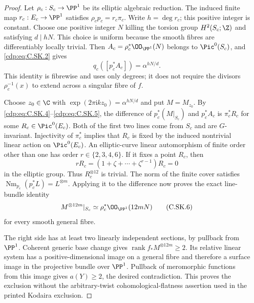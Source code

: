 \begin{proof}
Let $\rho_c:S_c\to\PP^1$ be its elliptic algebraic
reduction. The induced finite map $r_c:E_c\to\PP^1$
satisfies $\rho_c p_c=r_c\pi_c$. Write $h=\deg r_c$;
this positive integer is constant. Choose one positive
integer $N$ killing the torsion group $H^2(S_c;\Z)$
and satisfying $d\mid hN$. This choice is uniform
because the smooth fibres are differentiably locally
trivial. Then
$A_c=\rho_c^*\OO_{\PP^1}(N)$ belongs to $\Pic^0(S_c)$,
and \eqref{cdp:eq:C.SK.2} gives
\[
 q_c([p_c^*A_c])=\alpha^{hN/d}.
\tag{C.SK.5}\label{cdp:eq:C.SK.5}
\]
This identity is fibrewise and uses only degrees; it
does not require the divisors $\rho_c^{-1}(x)$ to
extend across a singular fibre of $f$.

Choose $z_0\in\C$ with
$\exp(2\pi\mathrm i k z_0)=\alpha^{hN/d}$ and put
$M=M_{z_0}$. By \eqref{cdp:eq:C.SK.4}--\eqref{cdp:eq:C.SK.5}, the difference of
$p_c^*(M|_{S_c})$ and $p_c^*A_c$ is
$\pi_c^*R_c$ for some $R_c\in\Pic^0(E_c)$.
Both of the first two lines come from $S_c$ and are
$G$-invariant. Injectivity of $\pi_c^*$ implies that
$R_c$ is fixed by the induced nontrivial linear action
on $\Pic^0(E_c)$. An elliptic-curve linear automorphism
of finite order other than one has order
$r\in\{2,3,4,6\}$. If it fixes a point $R_c$, then
\[
 rR_c=(1+\zeta+\cdots+\zeta^{r-1})R_c=0
\]
in the elliptic group. Thus $R_c^{\otimes12}$ is
trivial. The norm of the finite cover satisfies
$\operatorname{Nm}_{p_c}(p_c^*L)=L^{\otimes m}$.
Applying it to the difference now proves the exact
line-bundle identity
\[
 M^{\otimes12m}|_{S_c}
       \simeq \rho_c^*\OO_{\PP^1}(12mN)
\tag{C.SK.6}\label{cdp:eq:C.SK.6}
\]
for every smooth general fibre.

The right side has at least two linearly independent
sections, by pullback from $\PP^1$. Coherent generic
base change gives
$\operatorname{rank}f_*M^{\otimes12m}\ge2$.
Its relative linear system has a positive-dimensional
image on a general fibre and therefore a surface
image in the projective bundle over $\PP^1$.
Pullback of meromorphic functions from this image
gives $a(Y)\ge2$, the desired contradiction.
This proves the exclusion without the arbitrary-twist
cohomological-flatness assertion used in the printed
Kodaira exclusion.
\end{proof}


